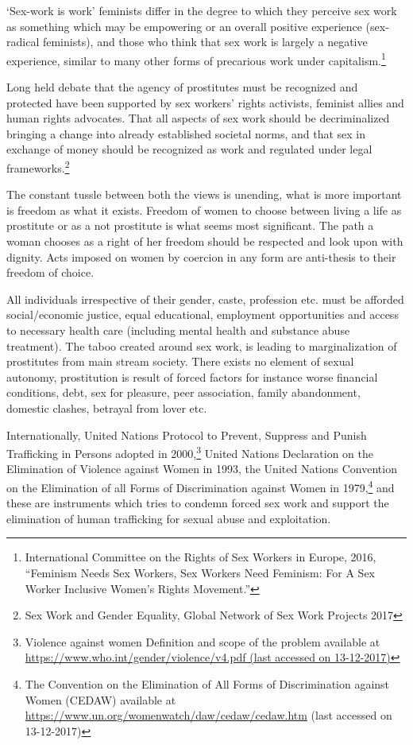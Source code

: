 \begin{multicols}{2}
\noi
‘Sex-work is work’ feminists differ in the degree to which they perceive sex work as something
which may be empowering or an overall positive experience (sex-radical feminists), and those
who think that sex work is largely a negative experience, similar to many other forms of
precarious work under capitalism.\footnote{International Committee on the Rights of Sex Workers in Europe, 2016, “Feminism Needs Sex Workers, Sex Workers Need Feminism: For A Sex Worker Inclusive Women’s Rights Movement.”}

\noi
Long held debate that the agency of prostitutes must be recognized and protected have been
supported by sex workers’ rights activists, feminist allies and human rights advocates. That all
aspects of sex work should be decriminalized bringing a change into already established
societal norms, and that sex in exchange of money should be recognized as work and regulated
under legal frameworks.\footnote{Sex Work and Gender Equality, Global Network of Sex Work Projects 2017}

\noi
The constant tussle between both the views is unending, what is more important is freedom as
what it exists. Freedom of women to choose between living a life as prostitute or as a not
prostitute is what seems most significant. The path a woman chooses as a right of her freedom
should be respected and look upon with dignity. Acts imposed on women by coercion in any
form are anti-thesis to their freedom of choice.


\noi
All individuals irrespective of their gender, caste, profession etc. must be afforded
social/economic justice, equal educational, employment opportunities and access to necessary
health care (including mental health and substance abuse treatment). The taboo created around
sex work, is leading to marginalization of prostitutes from main stream society. There exists no
element of sexual autonomy, prostitution is result of forced factors for instance worse financial
conditions, debt, sex for pleasure, peer association, family abandonment, domestic clashes,
betrayal from lover etc.

\noi
Internationally, United Nations Protocol to Prevent, Suppress and Punish Trafficking in Persons adopted in 2000,\footnote{Violence against women Definition and scope of the problem available at  \url{https://www.who.int/gender/violence/v4.pdf (last accessed on 13-12-2017)}} United Nations Declaration on the Elimination of Violence against Women in 1993, the United Nations Convention on the Elimination of all Forms of Discrimination against Women in 1979,\footnote{The Convention on the Elimination of All Forms of Discrimination against Women (CEDAW) available at \url{https://www.un.org/womenwatch/daw/cedaw/cedaw.htm} (last accessed on 13-12-2017)} and these are instruments which tries to condemn forced sex work and support the elimination of human trafficking for sexual abuse and exploitation.


\end{multicols}
